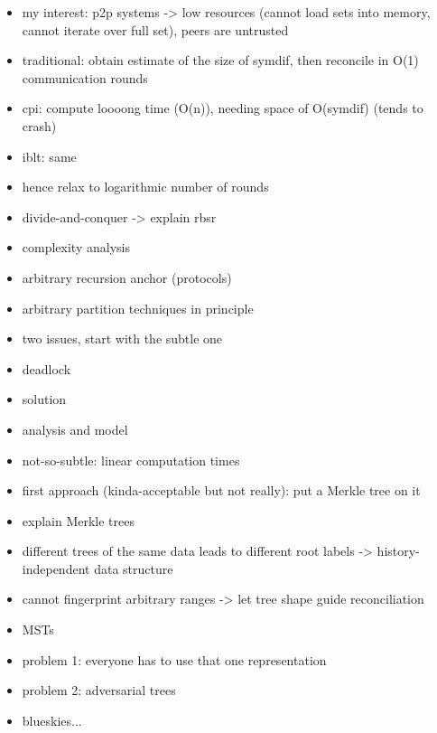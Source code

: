 \begin{frame}{}
    
\end{frame}

\begin{frame}{}
\begin{itemize}
    \item my interest: p2p systems -> low resources (cannot load sets into memory, cannot iterate over full set), peers are untrusted
    \item traditional: obtain estimate of the size of symdif, then reconcile in O(1) communication rounds
    \item cpi: compute loooong time (O(n)), needing space of O(symdif) (tends to crash)
    \item iblt: same
\end{itemize}

\begin{itemize}
    \item hence relax to logarithmic number of rounds
    \item divide-and-conquer -> explain rbsr
    \item complexity analysis
    \item arbitrary recursion anchor (protocols)
    \item arbitrary partition techniques in principle
\end{itemize}

\begin{itemize}
    \item two issues, start with the subtle one
    \item deadlock
    \item solution
    \item analysis and model
\end{itemize}

\begin{itemize}
    \item not-so-subtle: linear computation times
    \item first approach (kinda-acceptable but not really): put a Merkle tree on it
    \item explain Merkle trees
    \item different trees of the same data leads to different root labels -> history-independent data structure
    \item cannot fingerprint arbitrary ranges -> let tree shape guide reconciliation
    \item MSTs
    \item problem 1: everyone has to use that one representation
    \item problem 2: adversarial trees
    \item blueskies...
\end{itemize}


\end{frame}
